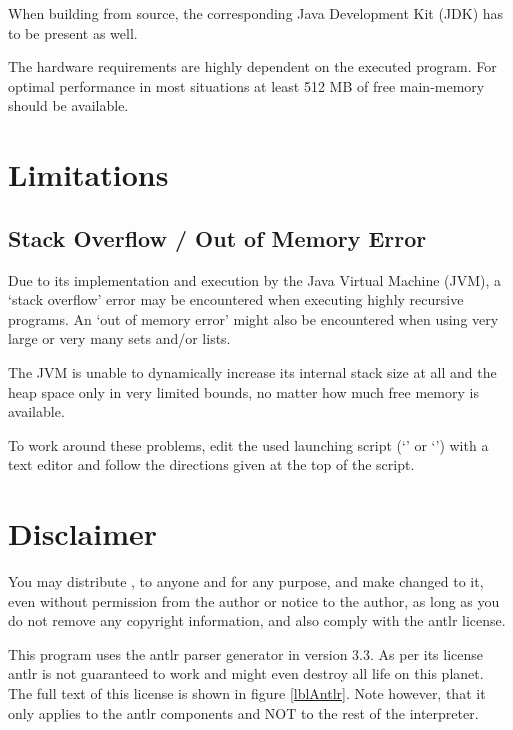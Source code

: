 When building from source, the corresponding Java Development Kit (JDK) has to be present as well.

The hardware requirements are highly dependent on the executed \SetlX{} program. For optimal performance in most situations at least 512 MB of free main-memory should be available.

\section{Limitations}

\subsection{Stack Overflow \slash{} Out of Memory Error}

Due to its implementation and execution by the Java Virtual Machine (JVM), a `stack overflow' error may be encountered when executing highly recursive \SetlX{} programs. An `out of memory error' might also be encountered when using very large or very many sets and\slash{}or lists.

The JVM is unable to dynamically increase its internal stack size at all and the heap space only in very limited bounds, no matter how much free memory is available.

To work around these problems, edit the used launching script (`' or `') with a text editor and follow the directions given at the top of the script.

%


\section{Disclaimer}
You may distribute \setlX{}, to anyone and for any purpose, and make changed to it, even without permission from the author or notice to the author, as long as you do not remove any copyright information, and also comply with the antlr license.

This program uses the antlr parser generator in version 3.3. As per its license antlr is not guaranteed to work and might even destroy all life on this planet. The full text of this license is shown in figure \ref{lblAntlr}. Note however, that it only applies to the antlr components and NOT to the rest of the interpreter.




